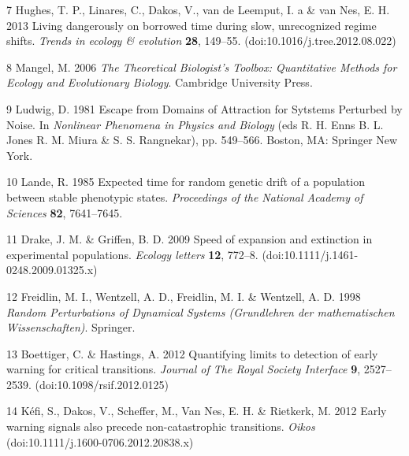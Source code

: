 \documentclass[review]{elsarticle} %
\begin{document}
7 Hughes, T. P., Linares, C., Dakos, V., van de Leemput, I. a \& van
Nes, E. H. 2013 Living dangerously on borrowed time during slow,
unrecognized regime shifts. \emph{Trends in ecology \& evolution}
\textbf{28}, 149--55. (doi:10.1016/j.tree.2012.08.022)

8 Mangel, M. 2006 \emph{The Theoretical Biologist's Toolbox:
Quantitative Methods for Ecology and Evolutionary Biology}. Cambridge
University Press.

9 Ludwig, D. 1981 Escape from Domains of Attraction for Sytstems
Perturbed by Noise. In \emph{Nonlinear Phenomena in Physics and Biology}
(eds R. H. Enns B. L. Jones R. M. Miura \& S. S. Rangnekar), pp.
549--566. Boston, MA: Springer New York.

10 Lande, R. 1985 Expected time for random genetic drift of a population
between stable phenotypic states. \emph{Proceedings of the National
Academy of Sciences} \textbf{82}, 7641--7645.

11 Drake, J. M. \& Griffen, B. D. 2009 Speed of expansion and extinction
in experimental populations. \emph{Ecology letters} \textbf{12}, 772--8.
(doi:10.1111/j.1461-0248.2009.01325.x)

12 Freidlin, M. I., Wentzell, A. D., Freidlin, M. I. \& Wentzell, A. D.
1998 \emph{Random Perturbations of Dynamical Systems (Grundlehren der
mathematischen Wissenschaften)}. Springer.

13 Boettiger, C. \& Hastings, A. 2012 Quantifying limits to detection of
early warning for critical transitions. \emph{Journal of The Royal
Society Interface} \textbf{9}, 2527--2539. (doi:10.1098/rsif.2012.0125)

14 Kéfi, S., Dakos, V., Scheffer, M., Van Nes, E. H. \& Rietkerk, M.
2012 Early warning signals also precede non-catastrophic transitions.
\emph{Oikos} (doi:10.1111/j.1600-0706.2012.20838.x)
\end{document}

